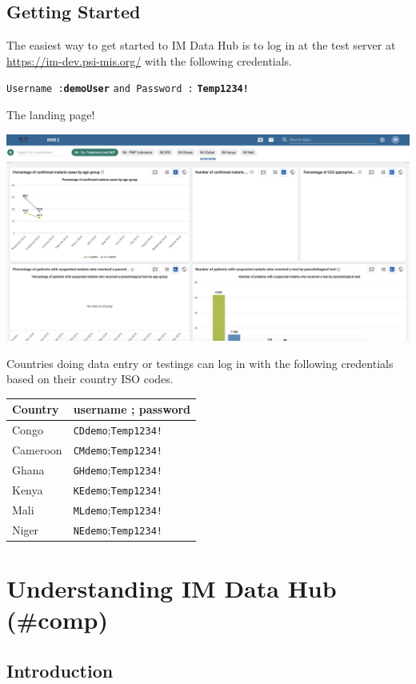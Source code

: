 \documentclass[]{book}
\begin{document}
\hypertarget{getting-started}{%
\section{Getting Started}\label{getting-started}}

The easiest way to get started to IM Data Hub is to log in at the test server at \url{https://im-dev.psi-mis.org/} with the following credentials.

\texttt{Username\ :}\textbf{\texttt{demoUser}} \texttt{and\ Password\ :} \textbf{\texttt{Temp1234!}}

The landing page!

\includegraphics[width=46.08in]{./images/landing-page}

Countries doing data entry or testings can log in with the following credentials based on their country ISO codes.

\begin{longtable}[]{@{}ll@{}}
\toprule
Country & username ; password\tabularnewline
\midrule
\endhead
Congo & \texttt{CDdemo};\texttt{Temp1234!}\tabularnewline
Cameroon & \texttt{CMdemo};\texttt{Temp1234!}\tabularnewline
Ghana & \texttt{GHdemo};\texttt{Temp1234!}\tabularnewline
Kenya & \texttt{KEdemo};\texttt{Temp1234!}\tabularnewline
Mali & \texttt{MLdemo};\texttt{Temp1234!}\tabularnewline
Niger & \texttt{NEdemo};\texttt{Temp1234!}\tabularnewline
\bottomrule
\end{longtable}

\hypertarget{understanding-im-data-hub-comp}{%
\chapter{Understanding IM Data Hub (\#comp)}\label{understanding-im-data-hub-comp}}

\hypertarget{introduction}{%
\section{Introduction}\label{introduction}}
\end{document}
